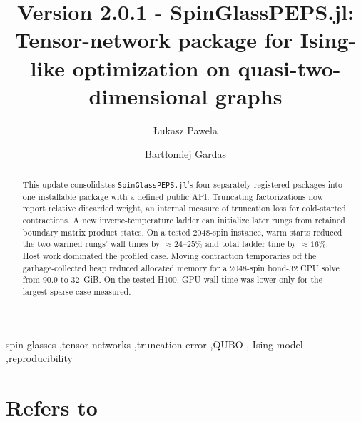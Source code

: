 \documentclass[preprint,12pt,a4paper]{elsarticle}
\begin{document}
\begin{frontmatter}

\title{Version 2.0.1 - SpinGlassPEPS.jl: Tensor-network package for
Ising-like optimization on quasi-two-dimensional graphs}

\author[iitis]{\L{}ukasz Pawela}
\author[iitis]{Bart\l{}omiej Gardas}


\address[iitis]{Institute of Theoretical and Applied Informatics, Polish Academy
of Sciences, Ba\l{}tycka 5, 44-100 Gliwice, Poland}

\begin{abstract}
This update consolidates \texttt{SpinGlassPEPS.jl}'s four separately registered
packages into one installable package with a defined public API. Truncating
factorizations now report relative discarded weight, an internal measure of
truncation loss for cold-started contractions. A new inverse-temperature ladder
can initialize later rungs from retained boundary matrix product states. On a
tested 2048-spin instance, warm starts reduced the two warmed rungs' wall times
by ${\approx}24$--$25\%$ and total ladder time by $\approx16\%$. Host work
dominated the profiled case. Moving contraction temporaries off the
garbage-collected heap reduced allocated memory for a 2048-spin bond-32 CPU solve
from 90.9 to 32~GiB. On the tested H100, GPU wall time was lower only for the
largest sparse case measured.
\end{abstract}

\begin{keyword}
spin glasses \sep tensor networks \sep truncation error \sep QUBO \sep
Ising model \sep reproducibility
\end{keyword}

\end{frontmatter}

\section*{Refers to}
\end{document}

